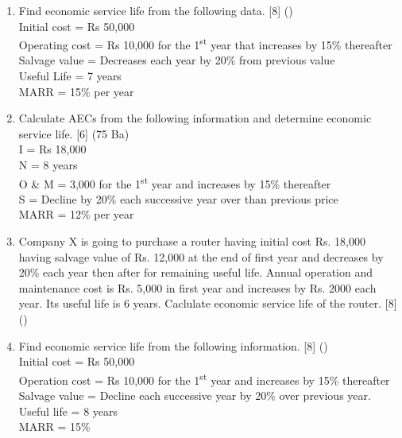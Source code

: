 \documentclass[12pt]{article}
\newcommand{\super}[1]{\textsuperscript{#1}}
\begin{document}
\begin{enumerate}
			\item Find economic service life from the following data. \hfill [8] ()\\
			Initial cost = Rs 50,000 \\
			Operating cost = Rs 10,000 for the 1\super{st} year that increases by 15\% thereafter \\
			Salvage value = Decreases each year by 20\% from previous value \\
			Useful Life = 7 years \\
			MARR = 15\% per year

			\item Calculate AECs from the following information and determine economic service life. \hfill [6] (75 Ba)\\
			I = Rs 18,000 \\
			N = 8 years \\
			O \& M = 3,000 for the 1\super{st} year and increases by 15\% thereafter \\
			S = Decline by 20\% each successive year over than previous price \\
			MARR = 12\% per year

			\item Company X is going to purchase a router having initial cost Rs. 18,000 having salvage value of Rs. 12,000 at the end of first year and decreases by 20\% each year then after for remaining useful life. Annual operation and maintenance cost is Rs. 5,000 in first year and increases by Rs. 2000 each year. Its useful life is 6 years. Caclulate economic service life of the router. \hfill [8] ()

			\item Find economic service life from the following information. \hfill [8] () \\
			Initial cost = Rs 50,000 \\
			Operation cost = Rs 10,000 for the 1\super{st} year and increases by 15\% thereafter \\
			Salvage value = Decline each successive year by 20\% over previous year. \\
			Useful life = 8 years \\
			MARR = 15\%


\end{enumerate}
\end{document}
